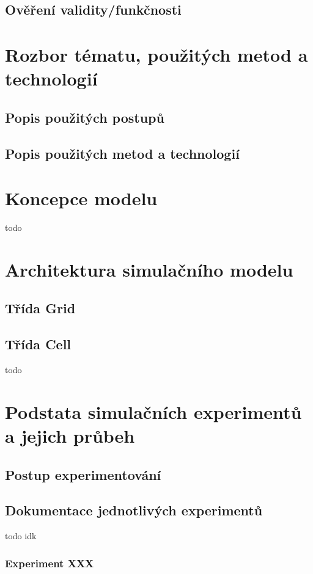 \documentclass[a4paper,11pt]{article}
\begin{document}
\subsection{Ověření validity/funkčnosti}

\section{Rozbor tématu, použitých metod a technologií}
\subsection{Popis použitých postupů}

\subsection{Popis použitých metod a technologií}


\section{Koncepce modelu}
todo

\section{Architektura simulačního modelu}
\subsection{Třída Grid}
\subsection{Třída Cell}
todo


\section{Podstata simulačních experimentů a jejich průbeh}
\subsection{Postup experimentování}
\subsection{Dokumentace jednotlivých experimentů}
todo idk
\subsubsection{Experiment XXX}
\end{document}
